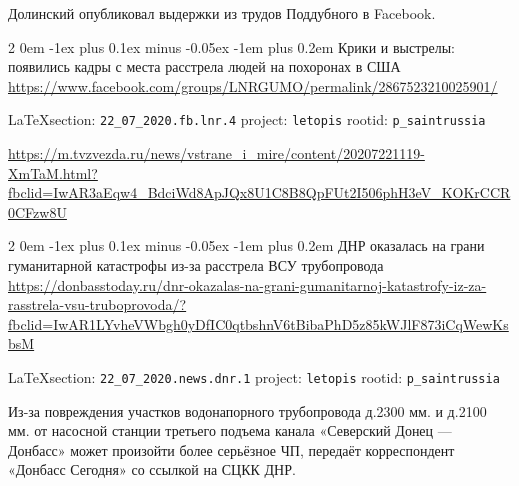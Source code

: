 \documentclass[a4paper,11pt]{extreport}
\makeatletter
\renewcommand\subsection{%
  \clearpage
    \@startsection{subsection}%
    {2}%
    {0em}%
    {-1ex plus 0.1ex minus -0.05ex}%
    {-1em plus 0.2em}%
    {\scshape\bfseries\Large}%
}
\makeatother
\begin{document}
Долинский опубликовал выдержки из трудов Поддубного в Facebook.
 
 
\subsection{Крики и выстрелы: появились кадры с места расстрела людей на похоронах в США}
\label{sec:22_07_2020.fb.lnr.4}
\url{https://www.facebook.com/groups/LNRGUMO/permalink/2867523210025901/}
  
\vspace{0.5cm}
{\small\LaTeX section: \verb|22_07_2020.fb.lnr.4| project: \verb|letopis| rootid: \verb|p_saintrussia|}
\vspace{0.5cm}

\url{https://m.tvzvezda.ru/news/vstrane_i_mire/content/20207221119-XmTaM.html?fbclid=IwAR3aEqw4_BdciWd8ApJQx8U1C8B8QpFUt2I506phH3eV_KOKrCCR0CFzw8U}
  

 
 

\subsection{ДНР оказалась на грани гуманитарной катастрофы из-за расстрела ВСУ трубопровода}
\label{sec:22_07_2020.news.dnr.1}
\url{https://donbasstoday.ru/dnr-okazalas-na-grani-gumanitarnoj-katastrofy-iz-za-rasstrela-vsu-truboprovoda/?fbclid=IwAR1LYvheVWbgh0yDfIC0qtbshnV6tBibaPhD5z85kWJlF873iCqWewKsbsM}
  
\vspace{0.5cm}
{\small\LaTeX section: \verb|22_07_2020.news.dnr.1| project: \verb|letopis| rootid: \verb|p_saintrussia|}
\vspace{0.5cm}

Из-за повреждения участков водонапорного трубопровода д.2300 мм. и д.2100 мм.
от насосной станции третьего подъема канала «Северский Донец --- Донбасс» может
произойти более серьёзное ЧП, передаёт корреспондент «Донбасс Сегодня» со
ссылкой на СЦКК ДНР.
\end{document}
